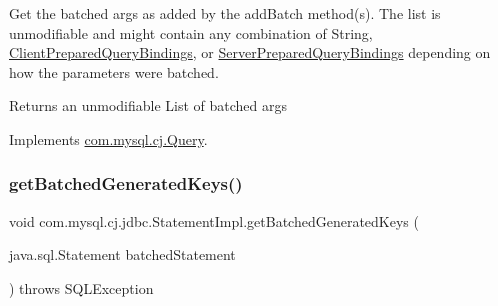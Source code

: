 Get the batched args as added by the add\+Batch method(s). The list is unmodifiable and might contain any combination of String, \mbox{\hyperlink{classcom_1_1mysql_1_1cj_1_1_client_prepared_query_bindings}{Client\+Prepared\+Query\+Bindings}}, or \mbox{\hyperlink{classcom_1_1mysql_1_1cj_1_1_server_prepared_query_bindings}{Server\+Prepared\+Query\+Bindings}} depending on how the parameters were batched.

\begin{DoxyReturn}{Returns}
an unmodifiable List of batched args 
\end{DoxyReturn}


Implements \mbox{\hyperlink{interfacecom_1_1mysql_1_1cj_1_1_query_af927782ce04741b0b0d3447e9b4f2a08}{com.\+mysql.\+cj.\+Query}}.

\mbox{\label{classcom_1_1mysql_1_1cj_1_1jdbc_1_1_statement_impl_af9a603cba639540f2cb9c6d998cf149e}} 
\subsubsection{\texorpdfstring{get\+Batched\+Generated\+Keys()}{getBatchedGeneratedKeys()}\hspace{0.1cm}{\footnotesize\ttfamily [1/2]}}
{\footnotesize\ttfamily void com.\+mysql.\+cj.\+jdbc.\+Statement\+Impl.\+get\+Batched\+Generated\+Keys (\begin{DoxyParamCaption}\item[{java.\+sql.\+Statement}]{batched\+Statement }\end{DoxyParamCaption}) throws S\+Q\+L\+Exception\hspace{0.3cm}{\ttfamily [protected]}}

\mbox{\label{classcom_1_1mysql_1_1cj_1_1jdbc_1_1_statement_impl_ae919819a2a02e89738113125b950d694}} 
